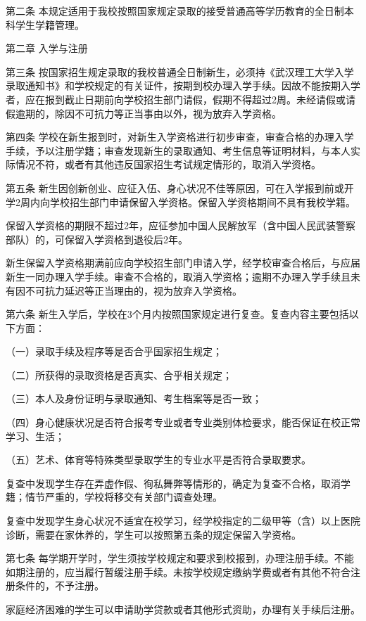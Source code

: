\documentclass[UTF8,12pt,a4paper]{report}
\begin{document}
第二条  本规定适用于我校按照国家规定录取的接受普通高等学历教育的全日制本科学生学籍管理。



第二章 入学与注册

第三条  按国家招生规定录取的我校普通全日制新生，必须持《武汉理工大学入学录取通知书》和学校规定的有关证件，按期到校办理入学手续。因故不能按期入学者，应在报到截止日期前向学校招生部门请假，假期不得超过2周。未经请假或请假逾期的，除因不可抗力等正当事由以外，视为放弃入学资格。

第四条  学校在新生报到时，对新生入学资格进行初步审查，审查合格的办理入学手续，予以注册学籍；审查发现新生的录取通知、考生信息等证明材料，与本人实际情况不符，或者有其他违反国家招生考试规定情形的，取消入学资格。

第五条  新生因创新创业、应征入伍、身心状况不佳等原因，可在入学报到前或开学2周内向学校招生部门申请保留入学资格。保留入学资格期间不具有我校学籍。

保留入学资格的期限不超过2年，应征参加中国人民解放军（含中国人民武装警察部队）的，可保留入学资格到退役后2年。

新生保留入学资格期满前应向学校招生部门申请入学，经学校审查合格后，与应届新生一同办理入学手续。审查不合格的，取消入学资格；逾期不办理入学手续且未有因不可抗力延迟等正当理由的，视为放弃入学资格。

第六条  新生入学后，学校在3个月内按照国家规定进行复查。复查内容主要包括以下方面：

（一）录取手续及程序等是否合乎国家招生规定；

（二）所获得的录取资格是否真实、合乎相关规定；

（三）本人及身份证明与录取通知、考生档案等是否一致；

（四）身心健康状况是否符合报考专业或者专业类别体检要求，能否保证在校正常学习、生活；

（五）艺术、体育等特殊类型录取学生的专业水平是否符合录取要求。

复查中发现学生存在弄虚作假、徇私舞弊等情形的，确定为复查不合格，取消学籍；情节严重的，学校将移交有关部门调查处理。

复查中发现学生身心状况不适宜在校学习，经学校指定的二级甲等（含）以上医院诊断，需要在家休养的，学生可以按照第五条的规定保留入学资格。

第七条  每学期开学时，学生须按学校规定和要求到校报到，办理注册手续。不能如期注册的，应当履行暂缓注册手续。未按学校规定缴纳学费或者有其他不符合注册条件的，不予注册。

家庭经济困难的学生可以申请助学贷款或者其他形式资助，办理有关手续后注册。
\end{document}
